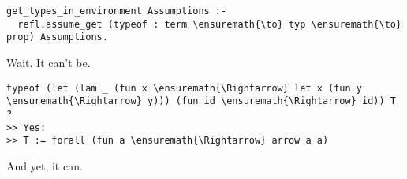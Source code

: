 \begin{verbatim}
get_types_in_environment Assumptions :-
  refl.assume_get (typeof : term \ensuremath{\to} typ \ensuremath{\to} prop) Assumptions.
\end{verbatim}

\heroSTUDENT{} Wait. It can't be.

\begin{verbatim}
typeof (let (lam _ (fun x \ensuremath{\Rightarrow} let x (fun y \ensuremath{\Rightarrow} y))) (fun id \ensuremath{\Rightarrow} id)) T ?
>> Yes:
>> T := forall (fun a \ensuremath{\Rightarrow} arrow a a)
\end{verbatim}

\heroADVISOR{} And yet, it can.
